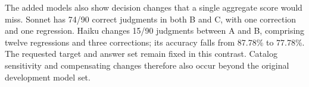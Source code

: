 The added models also show decision changes that a single aggregate score would miss. Sonnet has 74/90 correct judgments in both B and C, with one correction and one regression. Haiku changes 15/90 judgments between A and B, comprising twelve regressions and three corrections; its accuracy falls from 87.78\% to 77.78\%. The requested target and answer set remain fixed in this contrast. Catalog sensitivity and compensating changes therefore also occur beyond the original development model set.
